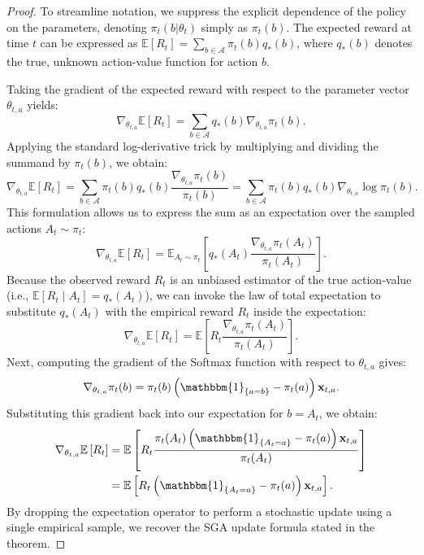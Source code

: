 \documentclass[pdflatex,sn-mathphys-num]{sn-jnl}
\theoremstyle{thmstyleone}%
\theoremstyle{thmstyletwo}%
\theoremstyle{thmstylethree}%
\begin{document}
\begin{proof}
    To streamline notation, we suppress the explicit dependence of the policy on the parameters, denoting $\pi_t(b|\theta_t)$ simply as $\pi_t(b)$. The expected reward at time $t$ can be expressed as $\mathbb{E}\left[ R_t \right] = \sum_{b \in \mathcal{A}} \pi_t(b)q_*(b)$, where $q_*(b)$ denotes the true, unknown action-value function for action $b$. 
    
    Taking the gradient of the expected reward with respect to the parameter vector $\theta_{t,a}$ yields:
    \begin{equation}
        \nabla_{\theta_{t,a}} \mathbb{E}\left[ R_t \right] = \sum_{b \in \mathcal{A}} q_*(b) \nabla_{\theta_{t,a}} \pi_t(b).
    \end{equation}
    Applying the standard log-derivative trick by multiplying and dividing the summand by $\pi_t(b)$, we obtain:
    \begin{equation}
        \nabla_{\theta_{t,a}} \mathbb{E}\left[ R_t \right] = \sum_{b \in \mathcal{A}} \pi_t(b) q_*(b) \frac{\nabla_{\theta_{t,a}} \pi_t(b)}{\pi_{t}(b)} = \sum_{b \in \mathcal{A}} \pi_t(b) q_*(b) \nabla_{\theta_{t,a}} \log \pi_t(b).
    \end{equation}
    This formulation allows us to express the sum as an expectation over the sampled actions $A_t \sim \pi_t$:
    \begin{equation}
        \nabla_{\theta_{t,a}} \mathbb{E}\left[ R_t \right] = \mathbb{E}_{A_t \sim \pi_t} \left[ q_*(A_t) \frac{\nabla_{\theta_{t,a}} \pi_t(A_t)}{\pi_{t}(A_t)} \right].
    \end{equation}
    Because the observed reward $R_t$ is an unbiased estimator of the true action-value (i.e., $\mathbb{E}[R_t \mid A_t] = q_*(A_t)$), we can invoke the law of total expectation to substitute $q_*(A_t)$ with the empirical reward $R_t$ inside the expectation:
    \begin{equation}
        \nabla_{\theta_{t,a}} \mathbb{E}\left[ R_t \right] = \mathbb{E}\left[ R_t \frac{\nabla_{\theta_{t,a}} \pi_t(A_t)}{\pi_{t}(A_t)} \right].
    \end{equation}
    Next, computing the gradient of the Softmax function with respect to $\theta_{t,a}$ gives:
    \begin{equation}
        \nabla_{\theta_{t,a}} \pi_t(b) = \pi_t(b)\left(\mathbbm{1}_{\{a=b\}} - \pi_t(a)\right)\mathbf{x}_{t,a}.
    \end{equation}
    Substituting this gradient back into our expectation for $b = A_t$, we obtain: 
    \begin{align}
        \nabla_{\theta_{t,a}} \mathbb{E}\left[ R_t \right] & = \mathbb{E}\left[ R_t \frac{\pi_t(A_t)\left(\mathbbm{1}_{\{A_t=a\}} - \pi_t(a)\right)\mathbf{x}_{t,a}}{\pi_{t}(A_t)} \right] \nonumber \\
        & = \mathbb{E}\left[ R_t\left(\mathbbm{1}_{\{A_t=a\}} - \pi_t(a)\right)\mathbf{x}_{t,a} \right].
    \end{align}
    By dropping the expectation operator to perform a stochastic update using a single empirical sample, we recover the SGA update formula stated in the theorem.
\end{proof}
\end{document}
